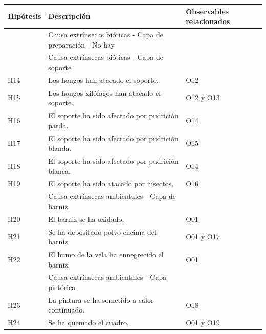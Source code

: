 \documentclass[a4paper,11pt]{article}
\begin{document}
			\newpage
			\begin{center}
				\begin{tabular}{| p{2cm} | p{6cm} | p{3cm} |}
					\hline
					\cellcolor[RGB]{224,233,250}\textbf{Hipótesis} &
					\cellcolor[RGB]{224,233,250}\textbf{Descripción} &
					\cellcolor[RGB]{224,233,250}\textbf{Observables relacionados}\\
 \hline
 \cellcolor[RGB]{224,233,250}& \cellcolor[RGB]{224,233,250}Causa extrínsecas bióticas - Capa de
 preparación - No hay & \cellcolor[RGB]{224,233,250}\\
 \hline
 \cellcolor[RGB]{224,233,250}& \cellcolor[RGB]{224,233,250}Causa extrínsecas bióticas - Capa de soporte
 &\cellcolor[RGB]{224,233,250}
 \\
 \hline
H14 & Los hongos han atacado el soporte. & O12\\
 \hline
H15 & Los hongos xilófagos han atacado el soporte. & O12 y O13\\
 \hline
H16 & El soporte ha sido afectado por pudrición parda. & O14\\
 \hline
H17 & El soporte ha sido afectado por pudrición blanda. & O15\\
 \hline
H18 & El soporte ha sido afectado por pudrición blanca. & O14\\
 \hline
H19 & El soporte ha sido atacado por insectos. & O16\\
 \hline
 \cellcolor[RGB]{224,233,250}& \cellcolor[RGB]{224,233,250}Causa extrínsecas ambientales - Capa de barniz
 & \cellcolor[RGB]{224,233,250}\\
 \hline
H20 & El barniz se ha oxidado. & O01\\
 \hline
H21 & Se ha depositado polvo encima del barniz. & O01 y O17\\
 \hline
H22 & El humo de la vela ha ennegrecido el barniz. & O01\\
 \hline
\cellcolor[RGB]{224,233,250} & \cellcolor[RGB]{224,233,250}Causa extrínsecas ambientales - Capa pictórica
& \cellcolor[RGB]{224,233,250}\\
 \hline
H23 & La pintura se ha sometido a calor continuado. & O18\\
 \hline
H24 & Se ha quemado el cuadro. & O01 y O19\\
 \hline
				\end{tabular}
			\end{center}
			\newpage
\end{document}
